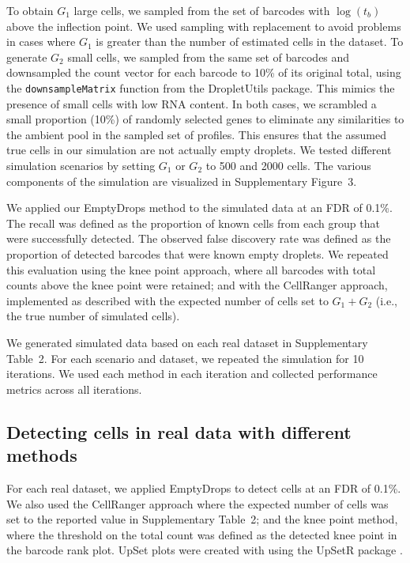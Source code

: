 \documentclass[10pt,letterpaper]{article}
\newcommand{\code}[1]{\texttt{#1}}
\newcommand{\supptabdataset}{2}
\newcommand{\suppfigsimdesign}{3}
\begin{document}
To obtain $G_1$ large cells, we sampled from the set of barcodes with $\log(t_b)$ above the inflection point.
We used sampling with replacement to avoid problems in cases where $G_1$ is greater than the number of estimated cells in the dataset.
To generate $G_2$ small cells, we sampled from the same set of barcodes and downsampled the count vector for each barcode to 10\% of its original total,
using the \code{downsampleMatrix} function from the \textsf{DropletUtils} package.
This mimics the presence of small cells with low RNA content. 
In both cases, we scrambled a small proportion (10\%) of randomly selected genes to eliminate any similarities to the ambient pool in the sampled set of profiles.
This ensures that the assumed true cells in our simulation are not actually empty droplets.
We tested different simulation scenarios by setting $G_1$ or $G_2$ to 500 and 2000 cells.
The various components of the simulation are visualized in Supplementary Figure~\suppfigsimdesign{}.

We applied our EmptyDrops method to the simulated data at an FDR of 0.1\%. 
The recall was defined as the proportion of known cells from each group that were successfully detected.
The observed false discovery rate was defined as the proportion of detected barcodes that were known empty droplets.
We repeated this evaluation using the knee point approach, where all barcodes with total counts above the knee point were retained;
and with the CellRanger approach, implemented as described \cite{zheng2017massively} with the expected number of cells set to $G_1+G_2$ (i.e., the true number of simulated cells).

We generated simulated data based on each real dataset in Supplementary Table~\supptabdataset{}.
For each scenario and dataset, we repeated the simulation for 10 iterations.
We used each method in each iteration and collected performance metrics across all iterations.

\subsection*{Detecting cells in real data with different methods}
For each real dataset, we applied EmptyDrops to detect cells at an FDR of 0.1\%. 
We also used the CellRanger approach where the expected number of cells was set to the reported value in Supplementary Table~\supptabdataset{};
and the knee point method, where the threshold on the total count was defined as the detected knee point in the barcode rank plot.
UpSet plots were created with using the \textsf{UpSetR} package \cite{lex2014upset}.
\end{document}
